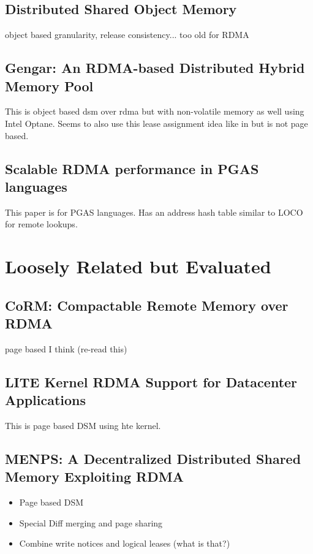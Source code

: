 \documentclass[sigplan,nonacm]{acmart}
\begin{document}
\subsection{Distributed Shared Object Memory}
object based granularity, release consistency... too old for RDMA\cite{Guedes-WWOSIII-1993}

\subsection{Gengar: An RDMA-based Distributed Hybrid Memory Pool}
This is object based dsm over rdma but with non-volatile memory as well using Intel Optane. Seems to 
also use this lease assignment idea like in \cite{Endo-IPDRM-2020} but is not page based.\cite{Duan-ICDCS-2021}

\subsection{Scalable RDMA performance in PGAS languages}
This paper is for PGAS languages. Has an address hash table similar to LOCO for remote lookups.\cite{Farreras-IPDPS-2009}

\section{Loosely Related but Evaluated}
\subsection{CoRM: Compactable Remote Memory over RDMA}
page based I think (re-read this)\cite{Taranov-ICMD-2021}

\subsection{LITE Kernel RDMA Support for Datacenter Applications}
This is page based DSM using hte kernel. \cite{Tsai-SOSP-2017}

\subsection{MENPS: A Decentralized Distributed Shared Memory Exploiting RDMA}
\begin{itemize}
    \item Page based DSM
    \item Special Diff merging and page sharing
    \item Combine write notices and logical leases (what is that?)\cite{Endo-IPDRM-2020}
\end{itemize}
\end{document}
